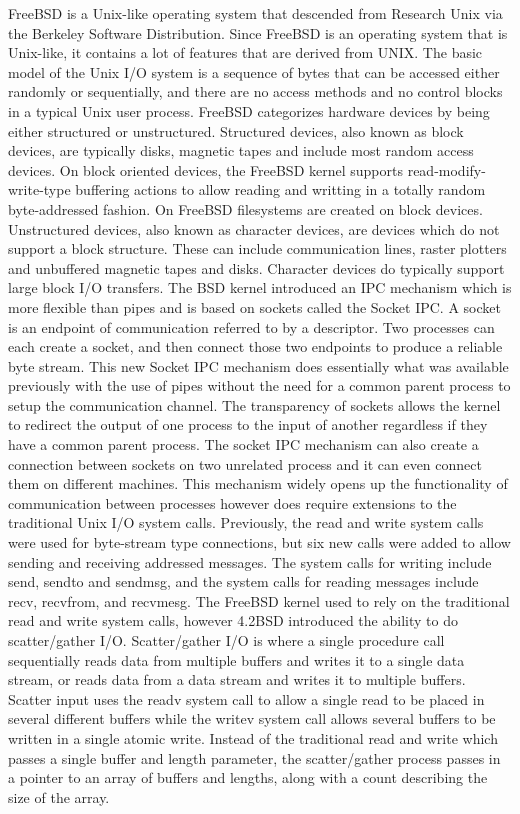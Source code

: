 \documentclass[letterpaper,10pt,draftclsnofoot,onecolumn,titlepage]{IEEEtran}
\begin{document}
		FreeBSD is a Unix-like operating system that descended from Research Unix via the Berkeley Software Distribution.
		Since FreeBSD is an operating system that is Unix-like, it contains a lot of features that are derived from UNIX.
		The basic model of the Unix I/O system is a sequence of bytes that can be accessed either randomly or sequentially, and there are no access methods and no control blocks in a typical Unix user process.
		FreeBSD categorizes hardware devices by being either structured or unstructured.
		Structured devices, also known as block devices, are typically disks, magnetic tapes and include most random access devices.
		On block oriented devices, the FreeBSD kernel supports read-modify-write-type buffering actions to allow reading and writting in a totally random byte-addressed fashion.
		On FreeBSD filesystems are created on block devices.
		Unstructured devices, also known as character devices, are devices which do not support a block structure.
		These can include communication lines, raster plotters and unbuffered magnetic tapes and disks.
		Character devices do typically support large block I/O transfers.
		The BSD kernel introduced an IPC mechanism which is more flexible than pipes and is based on sockets called the Socket IPC.
		A socket is an endpoint of communication referred to by a descriptor.
		Two processes can each create a socket, and then connect those two endpoints to produce a reliable byte stream.
		This new Socket IPC mechanism does essentially what was available previously with the use of pipes without the need for a common parent process to setup the communication channel.
		The transparency of sockets allows the kernel to redirect the output of one process to the input of another regardless if they have a common parent process.
		The socket IPC mechanism can also create a connection between sockets on two unrelated process and it can even connect them on different machines.
		This mechanism widely opens up the functionality of communication between processes however does require extensions to the traditional Unix I/O system calls.
		Previously, the read and write system calls were used for byte-stream type connections, but six new calls were added to allow sending and receiving addressed messages.
		The system calls for writing include send, sendto and sendmsg, and the system calls for reading messages include recv, recvfrom, and recvmesg.
		The FreeBSD kernel used to rely on the traditional read and write system calls, however 4.2BSD introduced the ability to do scatter/gather I/O. \cite{FreeBSD}
		Scatter/gather I/O is where a single procedure call sequentially reads data from multiple buffers and writes it to a single data stream, or reads data from a data stream and writes it to multiple buffers.
		Scatter input uses the readv system call to allow a single read to be placed in several different buffers while the writev system call allows several buffers to be written in a single atomic write.
		Instead of the traditional read and write which passes a single buffer and length parameter, the scatter/gather process passes in a pointer to an array of buffers and lengths, along with a count describing the size of the array.
\end{document}

